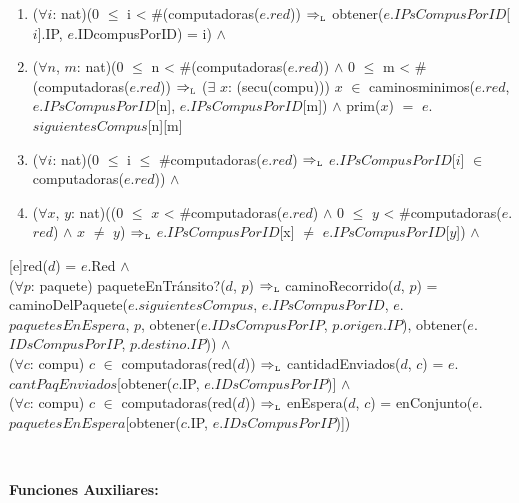 \begin{Representacion}
{\begin{enumerate}
\item	($\forall i$: nat)(0 $\leq$ i < \#(computadoras($e$.$red$)) $\Rightarrow_{\mathrm{\scriptscriptstyle{L}}}$ obtener($e$.$IPsCompusPorID$[$i$].IP, $e$.IDcompusPorID) = i) $\land$ 

\item	($\forall n$, $m$: nat)(0 $\leq$ n < \#(computadoras($e$.$red$)) $\land$ 0 $\leq$ m < \#(computadoras($e$.$red$)) $\Rightarrow_{\mathrm{\scriptscriptstyle{L}}}$ ($\exists$ $x$: (secu(compu))) $x$ $\in$ caminosminimos($e$.$red$, $e$.$IPsCompusPorID$[n], $e$.$IPsCompusPorID$[m]) $\land$ prim($x$) $=$ $e$.$siguientesCompus$[n][m] 

\item    ($\forall i$: nat)(0 $\leq$ i $\leq$ \#computadoras($e$.$red$) $\Rightarrow_{\mathrm{\scriptscriptstyle{L}}}$ $e$.$IPsCompusPorID$[$i$] $\in$ computadoras($e$.$red$)) $\land$ 

\item    ($\forall x$, $y$: nat)((0 $\leq$ $x$ < \#computadoras($e$.$red$) $\land$ 0 $\leq$ $y$ < \#computadoras($e$.$red$) $\land$ $x$ $\neq$ $y$) $\Rightarrow_{\mathrm{\scriptscriptstyle{L}}}$ $e$.$IPsCompusPorID$[x] $\neq$ $e$.$IPsCompusPorID$[$y$]) $\land$ 


    \end{enumerate} 
    
    }\mbox{} %

[e]{red($d$) = $e$.Red $\land$ \\

  ($\forall p$: paquete) paqueteEnTr\'ansito?($d$, $p$) $\Rightarrow_{\mathrm{\scriptscriptstyle{L}}}$ caminoRecorrido($d$, $p$) = caminoDelPaquete($e$.$siguientesCompus$, $e$.$IPsCompusPorID$, $e$.$paquetesEnEspera$, $p$, obtener($e$.$IDsCompusPorIP$, $p$.$origen$.$IP$), obtener($e$.$IDsCompusPorIP$, $p$.$destino$.$IP$)) $\land$ \\

  ($\forall c$: compu) $c$ $\in$ computadoras(red($d$)) $\Rightarrow_{\mathrm{\scriptscriptstyle{L}}}$ cantidadEnviados($d$, $c$) = $e$.$cantPaqEnviados$[obtener($c$.IP, $e$.$IDsCompusPorIP$)] $\land$ \\

  ($\forall c$: compu) $c$ $\in$ computadoras(red($d$)) $\Rightarrow_{\mathrm{\scriptscriptstyle{L}}}$ enEspera($d$, $c$) = enConjunto($e$.$paquetesEnEspera$[obtener($c$.IP, $e$.$IDsCompusPorIP$)])
}

  ~

  \textbf{Funciones Auxiliares:}

  ~




\end{Representacion}
